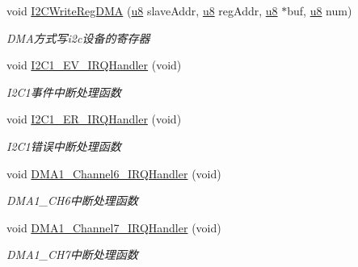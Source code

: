 \begin{DoxyCompactItemize}
void \hyperlink{group___i2_c_ga5ecce9ad43038ccd3847f2f9b90bbc36}{\-I2\-C\-Write\-Reg\-D\-M\-A} (\hyperlink{group___b_s_p_gaed742c436da53c1080638ce6ef7d13de}{u8} slave\-Addr, \hyperlink{group___b_s_p_gaed742c436da53c1080638ce6ef7d13de}{u8} reg\-Addr, \hyperlink{group___b_s_p_gaed742c436da53c1080638ce6ef7d13de}{u8} $\ast$buf, \hyperlink{group___b_s_p_gaed742c436da53c1080638ce6ef7d13de}{u8} num)
\begin{DoxyCompactList}\small\item\em \-D\-M\-A方式写i2c设备的寄存器 \end{DoxyCompactList}\item 
void \hyperlink{group___i2_c_ga272ffa65eb8ff5c4a065b0d3473611cd}{\-I2\-C1\-\_\-\-E\-V\-\_\-\-I\-R\-Q\-Handler} (void)
\begin{DoxyCompactList}\small\item\em \-I2\-C1事件中断处理函数 \end{DoxyCompactList}\item 
void \hyperlink{group___i2_c_gad25274aece51e7f5b821f5d32b31bddf}{\-I2\-C1\-\_\-\-E\-R\-\_\-\-I\-R\-Q\-Handler} (void)
\begin{DoxyCompactList}\small\item\em \-I2\-C1错误中断处理函数 \end{DoxyCompactList}\item 
void \hyperlink{group___i2_c_gab74311855aee10304ffc57c319c91ed3}{\-D\-M\-A1\-\_\-\-Channel6\-\_\-\-I\-R\-Q\-Handler} (void)
\begin{DoxyCompactList}\small\item\em \-D\-M\-A1\-\_\-\-C\-H6中断处理函数 \end{DoxyCompactList}\item 
void \hyperlink{group___i2_c_ga7a964205d5b1ce4b9c69ae6a105145ca}{\-D\-M\-A1\-\_\-\-Channel7\-\_\-\-I\-R\-Q\-Handler} (void)
\begin{DoxyCompactList}\small\item\em \-D\-M\-A1\-\_\-\-C\-H7中断处理函数 \end{DoxyCompactList}\end{DoxyCompactItemize}
